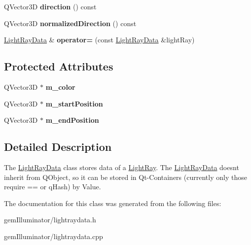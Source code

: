 \begin{DoxyCompactItemize}
\item 
\hypertarget{class_light_ray_data_a8fe5ec48ab375501e81610af12330cce}{}Q\+Vector3\+D {\bfseries direction} () const \label{class_light_ray_data_a8fe5ec48ab375501e81610af12330cce}

\item 
\hypertarget{class_light_ray_data_a472299411aab12213a9d712ea07f012b}{}Q\+Vector3\+D {\bfseries normalized\+Direction} () const \label{class_light_ray_data_a472299411aab12213a9d712ea07f012b}

\item 
\hypertarget{class_light_ray_data_a2dc01f58929829517a90b1fc29f12942}{}\hyperlink{class_light_ray_data}{Light\+Ray\+Data} \& {\bfseries operator=} (const \hyperlink{class_light_ray_data}{Light\+Ray\+Data} \&light\+Ray)\label{class_light_ray_data_a2dc01f58929829517a90b1fc29f12942}

\end{DoxyCompactItemize}
\subsection*{Protected Attributes}
\begin{DoxyCompactItemize}
\item 
\hypertarget{class_light_ray_data_ae6ad9fa7cd9bc9db1837691c603e5eaa}{}Q\+Vector3\+D $\ast$ {\bfseries m\+\_\+color}\label{class_light_ray_data_ae6ad9fa7cd9bc9db1837691c603e5eaa}

\item 
\hypertarget{class_light_ray_data_a1da577bdf12b630015fca5d89712e479}{}Q\+Vector3\+D $\ast$ {\bfseries m\+\_\+start\+Position}\label{class_light_ray_data_a1da577bdf12b630015fca5d89712e479}

\item 
\hypertarget{class_light_ray_data_ab7228a576b4b1c0843641e3706a6cb35}{}Q\+Vector3\+D $\ast$ {\bfseries m\+\_\+end\+Position}\label{class_light_ray_data_ab7228a576b4b1c0843641e3706a6cb35}

\end{DoxyCompactItemize}


\subsection{Detailed Description}
The \hyperlink{class_light_ray_data}{Light\+Ray\+Data} class stores data of a \hyperlink{class_light_ray}{Light\+Ray}. The \hyperlink{class_light_ray_data}{Light\+Ray\+Data} doesn\textquotesingle{}t inherit from Q\+Object, so it can be stored in Qt-\/\+Containers (currently only those require == or q\+Hash) by Value. 

The documentation for this class was generated from the following files\+:\begin{DoxyCompactItemize}
\item 
gem\+Illuminator/lightraydata.\+h\item 
gem\+Illuminator/lightraydata.\+cpp\end{DoxyCompactItemize}
